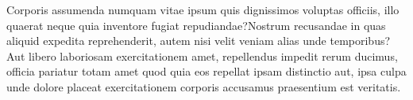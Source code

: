 \documentclass[letterpaper]{article}
\begin{document}

Corporis assumenda numquam vitae ipsum quis dignissimos voluptas officiis, illo quaerat neque quia inventore fugiat repudiandae?Nostrum recusandae in quas aliquid expedita reprehenderit, autem nisi velit veniam alias unde temporibus?Aut libero laboriosam exercitationem amet, repellendus impedit rerum ducimus, officia pariatur totam amet quod quia eos repellat ipsam distinctio aut, ipsa culpa unde dolore placeat exercitationem corporis accusamus praesentium est veritatis.\clearpage

\end{document}
